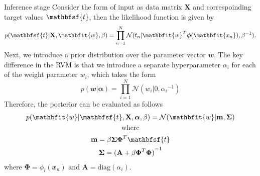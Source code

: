 \documentclass{bredelebeamer}
\begin{document}
\begin{frame}{Inference stage}
  Consider the form of input as data matrix $\mathbf{X}$ and correspoinding target
  values $\mathbfsf{t}$, then the likelihood function is given by
  \begin{equation}
    p(\mathbfsf{t}|\mathbf{X}, \mathbfit{w}, \beta) =
    \prod_{n=1}^{N} \mathcal{N}(t_n | \mathbfit{w}^T \boldsymbol{\phi}(\mathbfit{x_n}), \beta^{-1}).
  \end{equation}
  Next, we introduce a prior distribution over the parameter vector $\mathbfit{w}$.
  The key difference in the RVM is that we introduce a separate hyperparameter $\alpha_i$
  for each of the weight parameter $w_i$, which takes the form
  \begin{equation}
    p(\mathbfit{w}|\boldsymbol{\alpha}) = \prod_{i=1}^{N} \mathcal{N} (w_i | 0, {\alpha_i}^{-1})
  \end{equation}
  Therefore, the posterior can be evaluated as follows
  \begin{equation}
    \begin{gathered}
      p(\mathbfit{w} | \mathbfsf{t}, \mathbf{X}, \boldsymbol{\alpha}, \beta)
      = \mathcal{N} (\mathbfit{w} | \mathbf{m}, \boldsymbol{\Sigma}) \\
      \textrm{where} \\
      \mathbf{m} = \beta \boldsymbol{\Sigma} \boldsymbol{\Phi}^T \mathbfsf{t} \\
      \boldsymbol{\Sigma} = {(\mathbf{A} + \beta \boldsymbol{\Phi}^T \boldsymbol{\Phi})}^{-1}
    \end{gathered}
  \end{equation}
  where $\boldsymbol{\Phi} = \phi_i(\mathbfit{x}_n)$ and $\mathbf{A} = \textrm{diag}(\alpha_i)$.
\end{frame}
\end{document}
